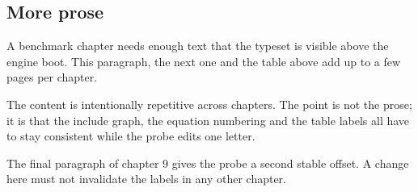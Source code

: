 \subsection{More prose}
A benchmark chapter needs enough text that the type\-set is visible above the
engine boot. This paragraph, the next one and the table above add up to a few
pages per chapter.

The content is intentionally repetitive across chapters. The point is not the
prose; it is that the include graph, the equation numbering and the table
labels all have to stay consistent while the probe edits one letter.

The final paragraph of chapter 9 gives the probe a second stable offset. A
change here must not invalidate the labels in any other chapter.
